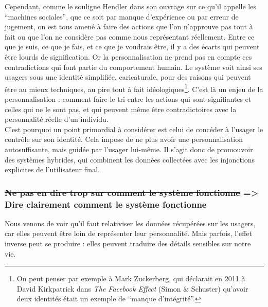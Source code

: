\documentclass[]{article}
\begin{document}
Cependant, comme le souligne Hendler dans son ouvrage sur ce qu'il
appelle les ``machines sociales'', que ce soit par manque d'expérience
ou par erreur de jugement, on est tous amené à faire des actions que
l'on n'approuve pas tout à fait ou que l'on ne considère pas comme nous
représentant réellement. Entre ce que je suis, ce que je fais, et ce que
je voudrais être, il y a des écarts qui peuvent être lourds de
signification. Or la personnalisation ne prend pas en compte ces
contradictions qui font partie du comportement humain. Le système voit
ainsi ses usagers sous une identité simplifiée, caricaturale, pour des
raisons qui peuvent être au mieux techniques, au pire tout à fait
idéologiques\footnote{On peut penser par exemple à Mark Zuckerberg, qui
  déclarait en 2011 à David Kirkpatrick dans \emph{The Facebook Effect}
  (Simon \& Schuster) qu'avoir deux identités était un exemple de
  ``manque d'intégrité''.}. C'est là un enjeu de la personnalisation :
comment faire le tri entre les actions qui sont signifiantes et celles
qui ne le sont pas, et qui peuvent même être contradictoires avec la
personnalité réelle d'un individu.\\

C'est pourquoi un point primordial à considérer est celui de concéder à
l'usager le contrôle sur son identité. Cela impose de ne plus avoir une
personnalisation autosuffisante, mais guidée par l'usager lui-même. Il
s'agit donc de promouvoir des systèmes hybrides, qui combinent les
données collectées avec les injonctions explicites de l'utilisateur
final.

\newpage

\hypertarget{ne-pas-en-dire-trop-sur-comment-le-systuxe8me-fonctionne-dire-clairement-comment-le-systuxe8me-fonctionne}{%
\subsubsection{\texorpdfstring{\sout{Ne pas en dire trop sur comment le
système fonctionne} =\textgreater{} Dire clairement comment le système
fonctionne}{Ne pas en dire trop sur comment le système fonctionne =\textgreater{} Dire clairement comment le système fonctionne}}\label{ne-pas-en-dire-trop-sur-comment-le-systuxe8me-fonctionne-dire-clairement-comment-le-systuxe8me-fonctionne}}

Nous venons de voir qu'il faut relativiser les données récupérées sur
les usagers, car elles peuvent être loin de représenter leur
personnalité. Mais parfois, l'effet inverse peut se produire : elles
peuvent traduire des détails sensibles sur notre vie.
\end{document}
